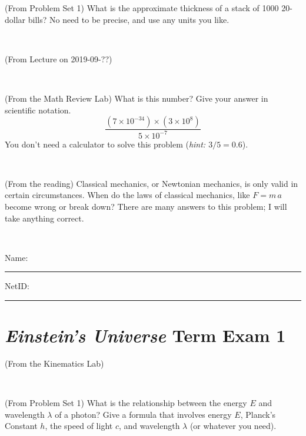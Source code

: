 \documentclass[12pt, letterpaper]{article}
\begin{document}
\begin{problem} (From Problem Set 1)
What is the approximate thickness of a stack of 1000 20-dollar bills?
No need to be precise, and use any units you like.
\end{problem}


\vfill ~

\begin{problem} (From Lecture on 2019-09-??)
\end{problem}


\vfill ~

\begin{problem} (From the Math Review Lab)
What is this number? Give your answer in scientific notation.
$$
\frac{(7\times10^{-34})\times(3\times10^8)}{5\times10^{-7}}
$$
You don't need a calculator to solve this problem (\textit{hint: $3/5=0.6$}).
\end{problem}


\vfill ~

\begin{problem} (From the reading)
Classical mechanics, or Newtonian mechanics, is only valid in certain
circumstances. When do the laws of classical mechanics, like $F =
m\,a$ become wrong or break down? There are many answers to this
problem; I will take anything correct.
\end{problem}


\vfill ~


\cleardoublepage



\noindent
Name: \rule[-1ex]{0.60\textwidth}{0.1pt}
NetID: \rule[-1ex]{0.20\textwidth}{0.1pt}

\section*{\textsl{Einstein's Universe} Term Exam 1}
\setcounter{problem}{1}


\begin{problem} (From the Kinematics Lab)

\end{problem}


\vfill ~

\begin{problem} (From Problem Set 1)
What is the relationship between the energy $E$ and wavelength
$\lambda$ of a photon? Give a formula that involves energy $E$,
Planck's Constant $h$, the speed of light $c$, and wavelength
$\lambda$ (or whatever you need).
\end{problem}
\end{document}
